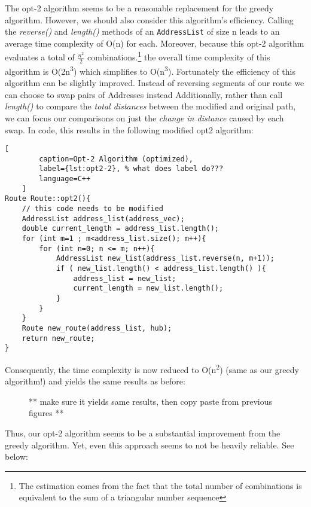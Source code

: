 \documentclass[letterpaper]{article}
\begin{document}
    The opt-2 algorithm seems to be a reasonable replacement for the 
    greedy algorithm. However, we should also consider this algorithm's 
    efficiency.  Calling the \emph{reverse()} and \emph{length()} methods of an 
    \verb|AddressList| of size n leads to an average time complexity of O(n)
    for each. Moreover, because this opt-2 algorithm evaluates a total of 
    \(\frac{n^2}{2}\) combinations.\footnote{The estimation comes from 
    the fact that the total number of combinations is equivalent to the 
    sum of a triangular number sequence} the overall time complexity of 
    this algorithm is O(2n\textsuperscript3)  which simplifies to 
    O(n\textsuperscript3). Fortunately the efficiency of this algorithm 
    can be slightly improved. Instead of reversing segments of our route 
    we can choose to swap pairs of Addresses instead  Additionally, rather 
    than call \emph{length()} to compare the \emph{total distances} between the 
    modified and original path, we can focus our comparisons on just the 
    \emph{change in distance} caused by each swap.  In code, this results 
    in the following modified opt2 algorithm:

    \begin{lstlisting}[
        caption=Opt-2 Algorithm (optimized),
        label={lst:opt2-2}, % what does label do???
        language=C++
    ]
Route Route::opt2(){
    // this code needs to be modified
    AddressList address_list(address_vec);
    double current_length = address_list.length();
    for (int m=1 ; m<address_list.size(); m++){
        for (int n=0; n <= m; n++){
            AddressList new_list(address_list.reverse(n, m+1));
            if ( new_list.length() < address_list.length() ){        
                address_list = new_list;
                current_length = new_list.length();
            } 
        }
    }
    Route new_route(address_list, hub);
    return new_route;
}
\end{lstlisting}
    Consequently, the time complexity is now reduced to 
    O(n\textsuperscript2) (same as our greedy algorithm!) 
    and yields the same results as before:
    
    \begin{figure}[h]
        \caption{** make sure it yields same results, then copy paste from previous figures **}
    \end{figure}

    Thus, our opt-2 algorithm seems to be a substantial 
    improvement from the greedy algorithm. Yet, even this 
    approach seems to not be heavily reliable. See below:
    
\end{document}
